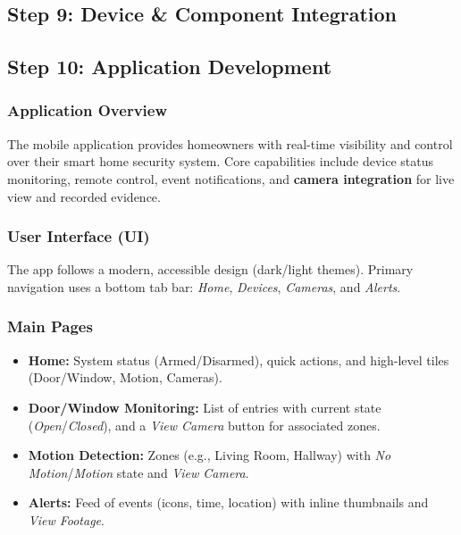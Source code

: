 \documentclass[conference]{IEEEtran}
\begin{document}
\cite{trustmebro2025}

\subsection{Step 9: Device \& Component Integration}

\subsection{Step 10: Application Development}

\subsubsection{Application Overview}
The mobile application provides homeowners with real-time visibility and control over their smart home security system. Core capabilities include device status monitoring, remote control, event notifications, and \textbf{camera integration} for live view and recorded evidence.

\subsubsection{User Interface (UI)}
The app follows a modern, accessible design (dark/light themes). Primary navigation uses a bottom tab bar: \emph{Home}, \emph{Devices}, \emph{Cameras}, and \emph{Alerts}.

\subsubsection{Main Pages}
\begin{itemize}
  \item \textbf{Home:} System status (Armed/Disarmed), quick actions, and high-level tiles (Door/Window, Motion, Cameras).
  \item \textbf{Door/Window Monitoring:} List of entries with current state (\emph{Open}/\emph{Closed}), and a \emph{View Camera} button for associated zones.
  \item \textbf{Motion Detection:} Zones (e.g., Living Room, Hallway) with \emph{No Motion}/\emph{Motion} state and \emph{View Camera}.
  \item \textbf{Alerts:} Feed of events (icons, time, location) with inline thumbnails and \emph{View Footage}.
\end{itemize}
\end{document}
